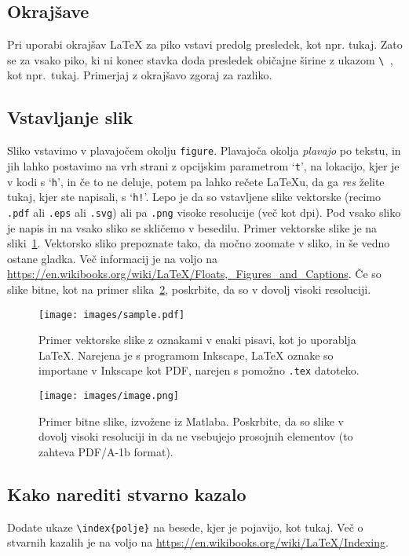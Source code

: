 \documentclass[mat2, anglescina, tisk]{fmfdelo}
\begin{document}
\begin{razsirjenipovzetek}
\subsection{Okrajšave}
Pri uporabi okrajšav \LaTeX{} za piko vstavi predolg presledek, kot npr. tukaj. Zato se za vsako
piko, ki ni konec stavka doda presledek običajne širine z ukazom \verb*|\ |, kot npr.\ tukaj.
Primerjaj z okrajšavo zgoraj za razliko.

\subsection{Vstavljanje slik}
Sliko vstavimo v plavajočem okolju \texttt{figure}. Plavajoča okolja \emph{plavajo} po tekstu, in
jih lahko postavimo na vrh strani z opcijskim parametrom `\texttt{t}', na lokacijo, kjer je v kodi s
`\texttt{h}', in če to ne deluje, potem pa lahko rečete \LaTeX u, da ga \emph{res} želite tukaj,
kjer ste napisali, s `\texttt{h!}'. Lepo je da so vstavljene slike vektorske (recimo \texttt{.pdf}
ali \texttt{.eps} ali \texttt{.svg}) ali pa \texttt{.png} visoke resolucije (več kot
\unit[300]{dpi}).  Pod vsako sliko je napis in na vsako sliko se skličemo v besedilu. Primer
vektorske slike je na sliki~\ref{fig:sample}. Vektorsko sliko prepoznate tako, da močno
zoomate v sliko, in še vedno ostane gladka. Več informacij je na voljo na
\url{https://en.wikibooks.org/wiki/LaTeX/Floats,_Figures_and_Captions}. Če so slike bitne, kot na
primer slika~\ref{fig:image}, poskrbite, da so v dovolj visoki resoluciji.

\begin{figure}[h]
  \centering
  \texttt{[image: images/sample.pdf]}
  \caption[Primer vektorske slike.]{Primer vektorske slike z oznakami v enaki pisavi, kot jo
     uporablja \LaTeX{}.  Narejena je s programom Inkscape, \LaTeX{} oznake so importane v
     Inkscape kot PDF, narejen s pomožno \texttt{.tex} datoteko.}
  \label{fig:sample}
\end{figure}

\begin{figure}[h]
  \centering
  \texttt{[image: images/image.png]}
  \caption[Primer bitne slike.]{Primer bitne slike, izvožene iz Matlaba. Poskrbite, da so slike v
  dovolj visoki resoluciji in da ne vsebujejo prosojnih elementov (to zahteva PDF/A-1b format).}
  \label{fig:image}
\end{figure}

\subsection{Kako narediti stvarno kazalo}
Dodate ukaze \verb|\index{polje}| na besede, kjer je pojavijo, kot tukaj.
Več o stvarnih kazalih je na voljo na \url{https://en.wikibooks.org/wiki/LaTeX/Indexing}.


\end{razsirjenipovzetek}
\end{document}
